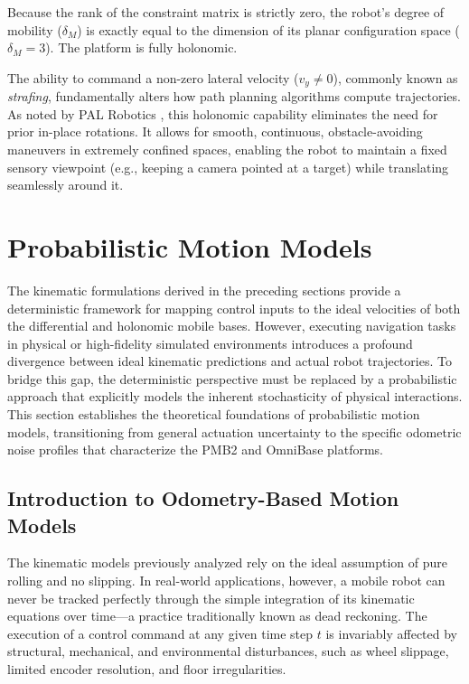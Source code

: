 Because the rank of the constraint matrix is strictly zero, the robot's degree of mobility ($\delta_M$) is exactly equal to the dimension of its planar configuration space ($\delta_M = 3$). The platform is fully holonomic. 

The ability to command a non-zero lateral velocity ($v_y \neq 0$), commonly known as \emph{strafing}, fundamentally alters how path planning algorithms compute trajectories. As noted by PAL Robotics \cite{pal_blog_omni_diff}, this holonomic capability eliminates the need for prior in-place rotations. It allows for smooth, continuous, obstacle-avoiding maneuvers in extremely confined spaces, enabling the robot to maintain a fixed sensory viewpoint (e.g., keeping a camera pointed at a target) while translating seamlessly around it.




\section{Probabilistic Motion Models}
\label{sec:probabilistic_motion_models}

The kinematic formulations derived in the preceding sections provide a deterministic framework for mapping control inputs to the ideal velocities of both the differential and holonomic mobile bases. However, executing navigation tasks in physical or high-fidelity simulated environments introduces a profound divergence between ideal kinematic predictions and actual robot trajectories. To bridge this gap, the deterministic perspective must be replaced by a probabilistic approach that explicitly models the inherent stochasticity of physical interactions. This section establishes the theoretical foundations of probabilistic motion models, transitioning from general actuation uncertainty to the specific odometric noise profiles that characterize the PMB2 and OmniBase platforms.

\subsection{Introduction to Odometry-Based Motion Models}
\label{subsec:intro_odometry_models}
The kinematic models previously analyzed rely on the ideal assumption of pure rolling and no slipping. In real-world applications, however, a mobile robot can never be tracked perfectly through the simple integration of its kinematic equations over time—a practice traditionally known as dead reckoning. The execution of a control command at any given time step $t$ is invariably affected by structural, mechanical, and environmental disturbances, such as wheel slippage, limited encoder resolution, and floor irregularities. 

